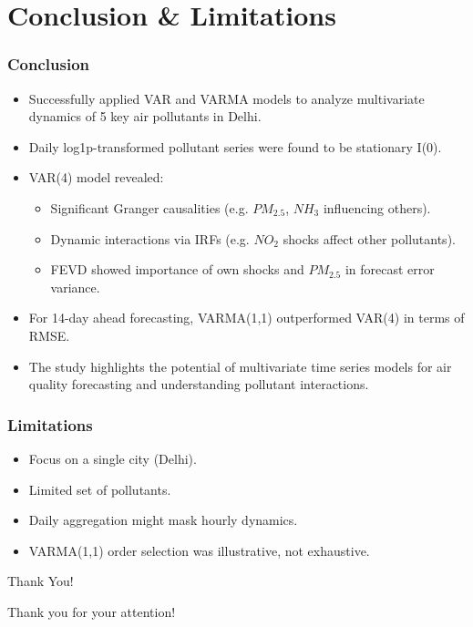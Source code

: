 \documentclass[svgnames, 12pt]{beamer}
\begin{document}
\section{Conclusion \& Limitations}
\begin{frame}
    \frametitle{Conclusion}
    \begin{itemize}
        \item Successfully applied VAR and VARMA models to analyze multivariate dynamics of 5 key air pollutants in Delhi.
        \item Daily log1p-transformed pollutant series were found to be stationary I(0).
        \item VAR(4) model revealed:
            \begin{itemize}
                \item Significant Granger causalities (e.g. $PM_{2.5}$, $NH_3$ influencing others).
                \item Dynamic interactions via IRFs (e.g. $NO_2$ shocks affect other pollutants).
                \item FEVD showed importance of own shocks and $PM_{2.5}$ in forecast error variance.
            \end{itemize}
        \item For 14-day ahead forecasting, VARMA(1,1) outperformed VAR(4) in terms of RMSE.
        \item The study highlights the potential of multivariate time series models for air quality forecasting and understanding pollutant interactions.
    \end{itemize}
\end{frame}

\begin{frame}
    \frametitle{Limitations}
    \begin{itemize}
        \item Focus on a single city (Delhi).
        \item Limited set of pollutants.
        \item Daily aggregation might mask hourly dynamics.
        \item VARMA(1,1) order selection was illustrative, not exhaustive.
    \end{itemize}
\end{frame}

\begin{frame}{Thank You!}
	\begin{center}
		\Huge Thank you for your attention!
	\end{center}
\end{frame}

\end{document}
